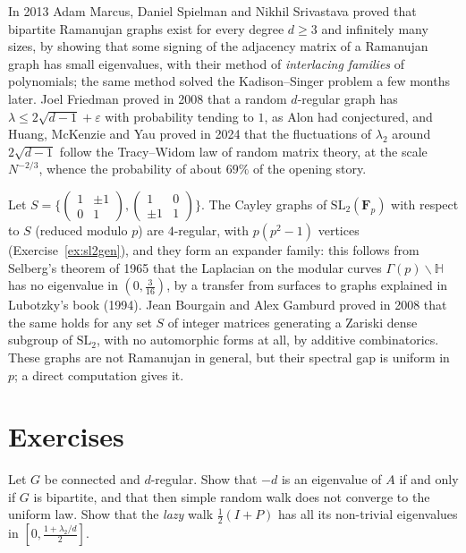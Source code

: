 \begin{remark}
In 2013 Adam Marcus, Daniel Spielman and Nikhil Srivastava proved that bipartite Ramanujan graphs exist for every degree $d\ge3$ and infinitely many sizes, by showing that some signing of the adjacency matrix of a
Ramanujan graph has small eigenvalues, with their method of \emph{interlacing families} of polynomials; the same method solved the Kadison--Singer problem a few months later. Joel Friedman proved in 2008 that a random
$d$-regular graph has $\lambda\le2\sqrt{d-1}+\varepsilon$ with probability tending to $1$, as Alon had conjectured, and Huang, McKenzie and Yau proved in 2024 that the fluctuations of $\lambda_2$ around $2\sqrt{d-1}$ follow
the Tracy--Widom law of random matrix theory, at the scale $N^{-2/3}$, whence the probability of about $69\%$ of the opening story.
\end{remark}

\begin{remark}
Let $S=\{(\begin{smallmatrix}1&\pm1\\0&1\end{smallmatrix}),(\begin{smallmatrix}1&0\\\pm1&1\end{smallmatrix})\}$. The Cayley graphs of $\mathrm{SL}_2(\mathbf F_p)$ with respect to $S$ (reduced modulo $p$) are $4$-regular, with $p(p^2-1)$
vertices (Exercise~\ref{ex:sl2gen}), and they form an expander family: this follows from Selberg's theorem of 1965 that the Laplacian on the modular curves $\Gamma(p)\backslash\mathbb H$ has no eigenvalue in $(0,\frac3{16})$,
by a transfer from surfaces to graphs explained in Lubotzky's book (1994). Jean Bourgain and Alex Gamburd proved in 2008 that the same holds for any set $S$ of integer matrices generating a Zariski dense subgroup of
$\mathrm{SL}_2$, with no automorphic forms at all, by additive combinatorics. These graphs are not Ramanujan in general, but their spectral gap is uniform in $p$; a direct computation gives it.
\end{remark}

\section{Exercises}

\begin{exercise}[$\star$]\label{ex:bipartiteeig}
Let $G$ be connected and $d$-regular. Show that $-d$ is an eigenvalue of $A$ if and only if $G$ is bipartite, and that then simple random walk does not converge to the uniform law. Show that the \emph{lazy} walk
$\frac12(I+P)$ has all its non-trivial eigenvalues in $[0,\frac{1+\lambda_2/d}2]$.
\end{exercise}

